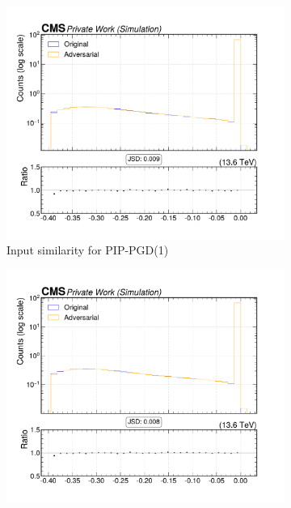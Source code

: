 \begin{figure}[htbp]
  \centering
  \begin{subfigure}[t]{0.32\textwidth}
    \includegraphics[width=\linewidth]{media/output/features/compare/combined_it_1/cmp_npf_arr_Npfcan_drminsv.pdf}
    \caption*{Input similarity for PIP-PGD(1)}
  \end{subfigure}\hfill
  \begin{subfigure}[t]{0.32\textwidth}
    \includegraphics[width=\linewidth]{media/output/features/compare/combined_it_2/cmp_npf_arr_Npfcan_drminsv.pdf}

\end{subfigure}
\end{figure}
